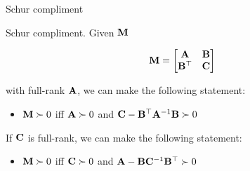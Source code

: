 \documentclass{beamer}
\begin{document}
\begin{frame}{Schur compliment}
	\begin{flushleft}
		
		Schur compliment. Given $\mathbf{M}$
		
		\begin{equation}
			\mathbf{M} = 
			\begin{bmatrix}
				\mathbf{A} & \mathbf{B} \\
				\mathbf{B}^\top & \mathbf{C}
			\end{bmatrix}
		\end{equation}
		
		with full-rank $\mathbf{A}$, we can make the following statement:
		
		\begin{itemize}
			\item $\mathbf{M} \succ 0$ iff $\mathbf{A} \succ 0$ and $\mathbf{C} - \mathbf{B}^\top\mathbf{A}^{-1}\mathbf{B} \succ 0$
		\end{itemize}
		
		\bigskip
		
		If $\mathbf{C}$ is full-rank, we can make the following statement:
		
		\begin{itemize}
			\item $\mathbf{M} \succ 0$ iff $\mathbf{C} \succ 0$ and $\mathbf{A} - \mathbf{B}\mathbf{C}^{-1}\mathbf{B}^\top \succ 0$
		\end{itemize}		
		
		
		
	\end{flushleft}
\end{frame}
\end{document}
